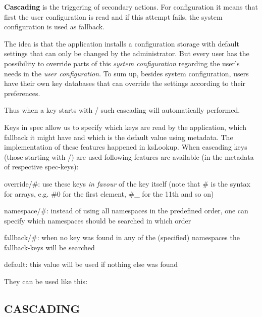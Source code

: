 {\bfseries Cascading} is the triggering of secondary actions. For configuration it means that first the user configuration is read and if this attempt fails, the system configuration is used as fallback.

The idea is that the application installs a configuration storage with default settings that can only be changed by the administrator. But every user has the possibility to override parts of this {\itshape system configuration} regarding the user's needs in the {\itshape user configuration}. To sum up, besides system configuration, users have their own key databases that can override the settings according to their preferences.

Thus when a key starts with {\ttfamily /} such cascading will automatically performed.

Keys in {\ttfamily spec} allow us to specify which keys are read by the application, which fallback it might have and which is the default value using metadata. The implementation of these features happened in {\ttfamily ks\+Lookup}. When cascading keys (those starting with {\ttfamily /}) are used following features are available (in the metadata of respective {\ttfamily spec}-\/keys)\+:


\begin{DoxyItemize}
\item {\ttfamily override/\#}\+: use these keys {\itshape in favour} of the key itself (note that {\ttfamily \#} is the syntax for arrays, e.\+g. {\ttfamily \#0} for the first element, {\ttfamily \#\+\_} for the 11th and so on)
\item {\ttfamily namespace/\#}\+: instead of using all namespaces in the predefined order, one can specify which namespaces should be searched in which order
\item {\ttfamily fallback/\#}\+: when no key was found in any of the (specified) namespaces the {\ttfamily fallback}-\/keys will be searched
\item {\ttfamily default}\+: this value will be used if nothing else was found
\end{DoxyItemize}

They can be used like this\+: 


\subsection*{C\+A\+S\+C\+A\+D\+I\+N\+G}

